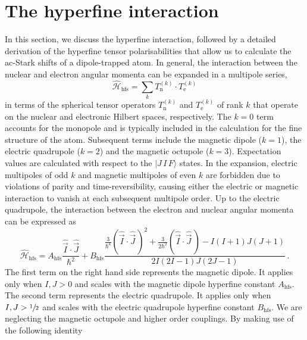 \documentclass[../Thesis-IJspeert.tex]{subfiles}
\begin{document}
\section{The hyperfine interaction}
\label{hyperfineinteraction}
In this section, we discuss the hyperfine interaction, followed by a detailed derivation of the hyperfine tensor polarisabilities that allow us to calculate the ac-Stark shifts of a dipole-trapped atom. In general, the interaction between the nuclear and electron angular momenta can be expanded in a multipole series,
\begin{equation}
\hat{\mathcal{H}}_{\text{hfs}}=\sum_{k}T_\text{n}^{(k)} \cdot T_\text{e}^{(k)}
\end{equation}
in terms of the spherical tensor operators $T_\text{n}^{(k)}$ and $T_\text{e}^{(k)}$ of rank $k$ that operate on the nuclear and electronic Hilbert spaces, respectively. The $k = 0$ term accounts for the monopole and is typically included in the calculation for the fine structure of the atom. Subsequent terms include the magnetic dipole ($k=1$), the electric quadrupole ($k=2$) and the magnetic octupole ($k=3$). Expectation values are calculated with respect to the $|J\, I\, F\rangle$ states. In the expansion, electric multipoles of odd $k$ and magnetic multipoles of even $k$ are forbidden due to violations of parity and time-reversibility, causing either the electric or magnetic interaction to vanish at each subsequent multipole order. Up to the electric quadrupole, the interaction between the electron and nuclear angular momenta can be expressed as
\begin{equation}
\label{hyperfinehamiltonian}
\hat{\mathcal{H}}_{\text{hfs}}=A_{\text{hfs}} \frac{\hat{\vec{I}} \cdot \hat{\vec{J}}}{\hbar^2}+B_{\text{hfs}} \frac{\frac{3}{\hbar^4} (\hat{\vec{I}} \cdot \hat{\vec{J}} \,)^2+\frac{3}{2 \hbar^2}(\hat{\vec{I}} \cdot \hat{\vec{J}}\,)-I(I+1) J(J+1)}{2 I(2 I-1) J(2 J-1)} \,.
\iffalse
+C_{\text{hfs}} \frac{\frac{10}{\hbar^3}(\mathbf{I} \cdot \mathbf{J})^3+\frac{20}{\hbar^2}(\mathbf{I} \cdot \mathbf{J})^2+\frac{2}{\hbar}(\mathbf{I} \cdot \mathbf{J})[I(I+1)+J(J+1)+3-3 I(I+1) J(J+1)]-5 I(I+1) J(J+1)}{I(I-1)(2 I-1) J(J-1)(2 J-1)} .
\fi
\end{equation}
The first term on the right hand side represents the magnetic dipole. It applies only when $I, J>0$ and scales with the magnetic dipole hyperfine constant $A_{\text{hfs}}$. The second term represents the electric quadrupole. It applies only when $I, J>\sfrac{1}{2}$ and scales with the electric quadrupole hyperfine constant $B_{\text{hfs}}$. We are neglecting the magnetic octupole and higher order couplings. By making use of the following identity
\end{document}
